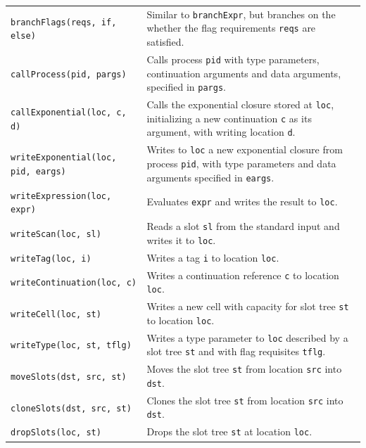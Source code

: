 \begin{table}
\begin{tabular}{p{0.385\linewidth} p{0.61\linewidth}}
\texttt{branchFlags(reqs, if, else)} &
Similar to \texttt{branchExpr}, but branches on the whether the flag requirements \texttt{reqs} are satisfied. \\

\texttt{callProcess(pid, pargs)} &
Calls process \texttt{pid} with type parameters, continuation arguments and data arguments, specified in \texttt{pargs}. \\

\texttt{callExponential(loc, c, d)} &
Calls the exponential closure stored at \texttt{loc}, initializing a new continuation \texttt{c} as its argument, with writing location \texttt{d}. \\

\texttt{writeExponential(loc, pid, eargs)} &
Writes to \texttt{loc} a new exponential closure from process \texttt{pid}, with type parameters and data arguments specified in \texttt{eargs}. \\

\texttt{writeExpression(loc, expr)} &
Evaluates \texttt{expr} and writes the result to \texttt{loc}. \\

\texttt{writeScan(loc, sl)} &
Reads a slot \texttt{sl} from the standard input and writes it to \texttt{loc}. \\

\texttt{writeTag(loc, i)} &
Writes a tag \texttt{i} to location \texttt{loc}. \\

\texttt{writeContinuation(loc, c)} &
Writes a continuation reference \texttt{c} to location \texttt{loc}. \\

\texttt{writeCell(loc, st)} &
Writes a new cell with capacity for slot tree \texttt{st} to location \texttt{loc}. \\

\texttt{writeType(loc, st, tflg)} &
Writes a type parameter to \texttt{loc} described by a slot tree \texttt{st} and with flag requisites \texttt{tflg}.\\

\texttt{moveSlots(dst, src, st)} &
Moves the slot tree \texttt{st} from location \texttt{src} into \texttt{dst}.\\

\texttt{cloneSlots(dst, src, st)} &
Clones the slot tree \texttt{st} from location \texttt{src} into \texttt{dst}.\\

\texttt{dropSlots(loc, st)} &
Drops the slot tree \texttt{st} at location \texttt{loc}.\\


\end{tabular}
\end{table}
